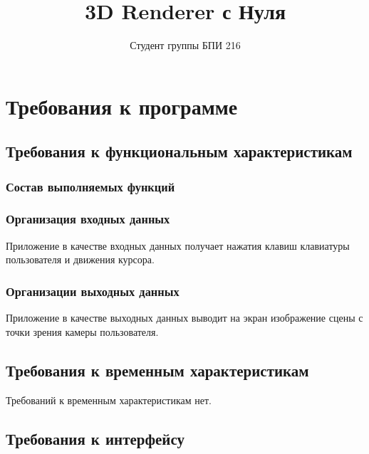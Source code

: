 \documentclass{../TechDoc}
\title{3D Renderer с Нуля}
\author{Студент группы БПИ 216}{Г. А. Сабаев}
\begin{document}
    \maketitle
    
    \tableofcontents
    
    
    
    

    \section{Требования к программе}
    
    \subsection{Требования к функциональным характеристикам}
    \subsubsection{Состав выполняемых функций}
    
    
        
    \subsubsection{Организация входных данных}

    Приложение в качестве входных данных получает нажатия клавиш клавиатуры пользователя и движения курсора.

    \subsubsection{Организации выходных данных}
    
    Приложение в качестве выходных данных выводит на экран изображение сцены с точки зрения камеры пользователя.

    \subsection{Требования к временным характеристикам}

    Требований к временным характеристикам нет.

    \subsection{Требования к интерфейсу}
        
\end{document}
